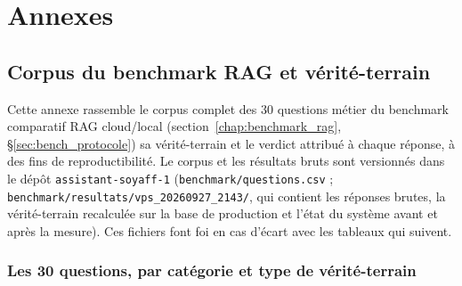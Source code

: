 \appendix
\part*{Annexes}

\chapter{Corpus du benchmark RAG et vérité-terrain}
\label{annexe:corpus}

Cette annexe rassemble le corpus complet des 30 questions métier du benchmark comparatif RAG cloud/local (section~\ref{chap:benchmark_rag}, §\ref{sec:bench_protocole}) sa vérité-terrain et le verdict attribué à chaque réponse, à des fins de reproductibilité. Le corpus et les résultats bruts sont versionnés dans le dépôt \texttt{assistant-soyaff-1} (\texttt{benchmark/questions.csv} ; \texttt{benchmark/resultats/vps\_20260927\_2143/}, qui contient les réponses brutes, la vérité-terrain recalculée sur la base de production et l'état du système avant et après la mesure). Ces fichiers font foi en cas d'écart avec les tableaux qui suivent.

\section{Les 30 questions, par catégorie et type de vérité-terrain}

